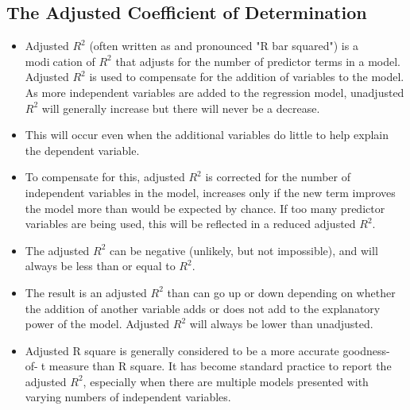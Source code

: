\documentclass[]{report}
\begin{document}
\subsection*{The Adjusted Coefficient of Determination}
\begin{itemize}
	\item Adjusted $R^2$ (often written as and pronounced "R bar squared") is a modication of $R^2$ that
	adjusts for the number of predictor terms in a model. Adjusted $R^2$ is used to compensate
	for the addition of variables to the model. As more independent variables are added to the
	regression model, unadjusted $R^2$ will generally increase but there will never be a decrease.
\item This
	will occur even when the additional variables do little to help explain the dependent variable.
\item To compensate for this, adjusted $R^2$ is corrected for the number of independent variables in
	the model, increases only if the new term improves the model more than would be expected
	by chance. If too many predictor variables are being used, this will be reflected in a reduced adjusted $R^2$. 
	\item The adjusted $R^2$ can be negative (unlikely, but not impossible), and will always be less than or equal to $R^2$.
\item The result is an adjusted $R^2$ than can go up or down depending on whether the addition of
	another variable adds or does not add to the explanatory power of the model. Adjusted $R^2$ will
	always be lower than unadjusted.
\item Adjusted R square is generally considered to be a more accurate goodness-of-t measure
	than R square. It has become standard practice to report the adjusted $R^2$, especially when
	there are multiple models presented with varying numbers of independent variables. 
\end{itemize}
\newpage
\end{document}
